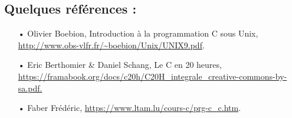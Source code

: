 \documentclass[10pt,a4paper]{article}
\begin{document}
\subsection*{Quelques références :}
\begin{itemize}
\item[•] Olivier Boebion, Introduction à la programmation C sous Unix, \url{http://www.obs-vlfr.fr/~boebion/Unix/UNIX9.pdf}. \\
\item[•] Eric Berthomier \& Daniel Schang, Le C en 20 heures, \url{https://framabook.org/docs/c20h/C20H_integrale_creative-commons-by-sa.pdf.}\\

\item[•]Faber Frédéric, \url{https://www.ltam.lu/cours-c/prg-c_c.htm}.
\end{itemize}
\end{document}
